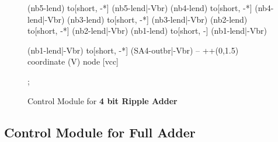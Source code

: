 \documentclass[a4paper, 10pt]{article}
\begin{document}
\begin{figure}[!h]
{\begin{circuitikz}[american, rotate=-90, transform shape]
			(nb5-lend) to[short, -*] (nb5-lend|-Vbr)
			(nb4-lend) to[short, -*] (nb4-lend|-Vbr)
			(nb3-lend) to[short, -*] (nb3-lend|-Vbr)
			(nb2-lend) to[short, -*] (nb2-lend|-Vbr)
			(nb1-lend) to[short, -] (nb1-lend|-Vbr)

			(nb1-lend|-Vbr)
			to[short, -*] (SA4-outbr|-Vbr)
			-- ++(0,1.5)
			coordinate (V)
			node [vcc] {\vccPotential}

			;

		\end{circuitikz}
		}
		\caption{Control Module for \textbf{4 bit Ripple Adder}}
	\end{figure}


\clearpage

\subsection{Control Module for Full Adder}
\end{document}

